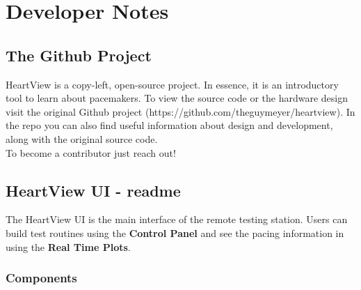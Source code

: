 \documentclass[11pt,fleqn]{book} %
\begin{document}




\cite{van_gogh} %

\chapter{Developer Notes}


\section{The Github Project}

HeartView is a copy-left, open-source project. In essence, it is an introductory tool to learn about pacemakers. To view the source code or the hardware design visit the original Github project (https://github.com/theguymeyer/heartview). In the repo you can also find useful information about design and development, along with the original source code. \\

To become a contributor just reach out!

\section{HeartView UI - readme}

The HeartView UI is the main interface of the remote testing station. Users can build test routines using the \textbf{Control Panel} and see the pacing information in using the \textbf{Real Time Plots}.

\subsection{Components}
\end{document}
